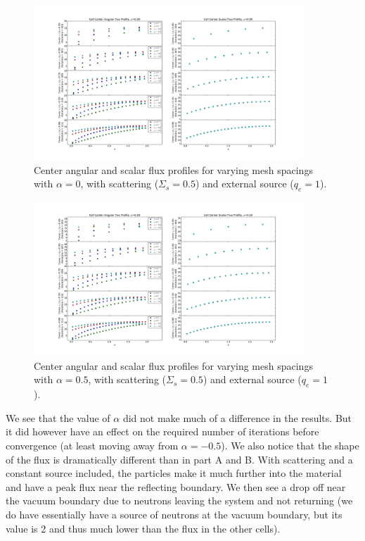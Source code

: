 \documentclass[10pt]{article}
\begin{document}
\begin{figure}[H]
    \centering
    \includegraphics[width=0.9\textwidth]{Figures/FluxProfile_a=0_source}
    \caption{Center angular and scalar flux profiles for varying mesh spacings with $\alpha = 0$, with scattering ($\Sigma_s = 0.5$) and external source ($q_e=1$).}
    \label{fig9}
\end{figure}

\begin{figure}[H]
    \centering
    \includegraphics[width=0.9\textwidth]{Figures/FluxProfile_a=05_source}
    \caption{Center angular and scalar flux profiles for varying mesh spacings with $\alpha = 0.5$, with scattering ($\Sigma_s = 0.5$) and external source ($q_e=1$).}
    \label{fig10}
\end{figure}

\newpage
We see that the value of $\alpha$ did not make much of a difference in the results. But it did however have an effect on the required number of iterations before convergence (at least moving away from $\alpha = -0.5$). We also notice that the shape of the flux is dramatically different than in part A and B. With scattering and a constant source included, the particles make it much further into the material and have a peak flux near the reflecting boundary. We then see a drop off near the vacuum boundary due to neutrons leaving the system and not returning (we do have essentially have a source of neutrons at the vacuum boundary, but its value is 2 and thus much lower than the flux in the other cells). 
\end{document}
